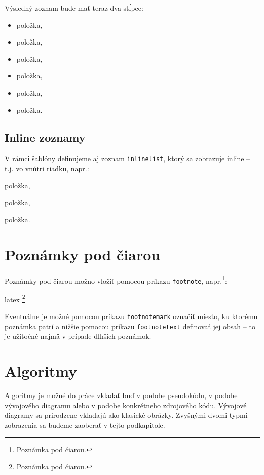 Výsledný zoznam bude mať teraz dva stĺpce:
\begin{multicols}{2}
\begin{itemize}
\item položka,
\item položka,
\item položka,
\item položka,
\item položka,
\item položka.
\end{itemize}
\end{multicols}

\subsection{Inline zoznamy}

V rámci šablóny definujeme aj zoznam \texttt{inlinelist}, ktorý sa zobrazuje inline -- t.j. vo vnútri riadku, napr.:
\begin{inlinelist}
\item položka,
\item položka,
\item položka.
\end{inlinelist}

\section{Poznámky pod čiarou}

Poznámky pod čiarou možno vložiť pomocou príkazu \texttt{footnote}, napr.\footnote{Poznámka pod čiarou.}:
\begin{inlinecode}{latex}
\footnote{Poznámka pod čiarou.}
\end{inlinecode}

Eventuálne je možné pomocou príkazu \texttt{footnotemark} označiť miesto, ku ktorému poznámka patrí a nižšie pomocou príkazu \texttt{footnotetext} definovať jej obsah -- to je užitočné najmä v prípade dlhších poznámok.

\section{Algoritmy}

Algoritmy je možné do práce vkladať buď v podobe pseudokódu, v podobe vývojového diagramu alebo v podobe konkrétneho zdrojového kódu. Vývojové diagramy sa prirodzene vkladajú ako klasické obrázky. Zvyšnými dvomi typmi zobrazenia sa budeme zaoberať v tejto podkapitole.

